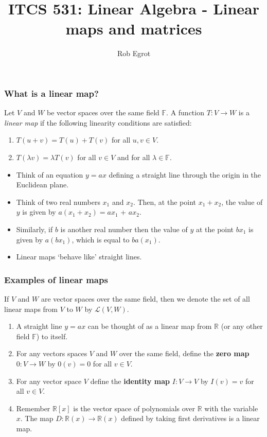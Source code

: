 \documentclass[handout]{beamer}
\title{ITCS 531: Linear Algebra - Linear maps and matrices}
\date{}
\author{Rob Egrot}
\newcommand{\bR}{\mathbb{R}}
\newcommand{\bF}{\mathbb{F}}
\newcommand{\cL}{\mathcal{L}}
\begin{document}
\begin{frame}
\titlepage
\end{frame}

\begin{frame}
\frametitle{What is a linear map?}
\begin{definition}\label{D:LA3map}
Let $V$ and $W$ be vector spaces over the same field $\bF$. A function $T:V\to W$ is a \emph{linear map} if the following linearity conditions are satisfied:
\begin{enumerate}
\item $T(u+v) = T(u) + T(v)$ for all $u,v\in V$.
\item $T(\lambda v)= \lambda T(v)$ for all $v\in V$ and for all $\lambda\in\bF$.
\end{enumerate}
\end{definition}
\begin{itemize}
\item Think of an equation $y = ax$ defining a straight line through the origin in the Euclidean plane. 
\item Think of two real numbers $x_1$ and $x_2$. Then, at the point $x_1+ x_2$, the value of $y$ is given by $a(x_1+x_2)=ax_1$ + $ax_2$. 
\item Similarly, if $b$ is another real number then the value of $y$ at the point $bx_1$ is given by $a(bx_1)$, which is equal to $ba(x_1)$. 
\item Linear maps `behave like' straight lines.
\end{itemize}
\end{frame}

\begin{frame}
\frametitle{Examples of linear maps}

\begin{definition}[$\cL(V,W)$]
If $V$ and $W$ are vector spaces over the same field, then we denote the set of all linear maps from $V$ to $W$ by $\cL(V,W)$.
\end{definition}

\begin{example}\label{E:LA3maps}
\begin{enumerate}
\item A straight line $y = ax$ can be thought of as a linear map from $\bR$ (or any other field $\bF$) to itself.
\item  For any vectors spaces $V$ and $W$ over the same field, define the \textbf{zero map} $0:V\to W$ by $0(v) = 0$ for all $v\in V$.
\item For any vector space $V$ define the \textbf{identity map} $I:V\to V$ by $I(v) = v$ for all $v\in V$. 
\item Remember $\bR[x]$ is the vector space of polynomials over $\bR$ with the variable $x$. The map $D:\bR(x)\to \bR(x)$ defined by taking first derivatives is a linear map. 
\end{enumerate}
\end{example}
\end{frame}
\end{document}
